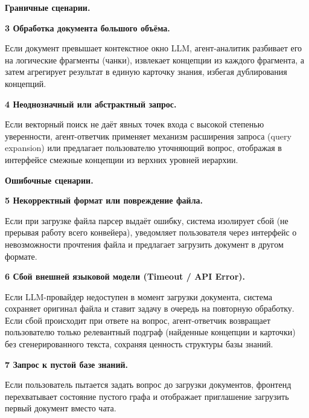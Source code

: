 \vspace{0.5em}
\textbf{Граничные сценарии.}

\vspace{0.5em}
\textbf{3 Обработка документа большого объёма.}

Если документ превышает контекстное окно LLM, агент-аналитик разбивает его на логические фрагменты (чанки), извлекает концепции из каждого фрагмента, а затем агрегирует результат в единую карточку знания, избегая дублирования концепций.

\vspace{0.5em}
\textbf{4 Неоднозначный или абстрактный запрос.}

Если векторный поиск не даёт явных точек входа с высокой степенью уверенности, агент-ответчик применяет механизм расширения запроса (query expansion) или предлагает пользователю уточняющий вопрос, отображая в интерфейсе смежные концепции из верхних уровней иерархии.

\vspace{0.5em}
\textbf{Ошибочные сценарии.}

\vspace{0.5em}
\textbf{5 Некорректный формат или повреждение файла.}

Если при загрузке файла парсер выдаёт ошибку, система изолирует сбой (не прерывая работу всего конвейера), уведомляет пользователя через интерфейс о невозможности прочтения файла и предлагает загрузить документ в другом формате.

\vspace{0.5em}
\textbf{6 Сбой внешней языковой модели (Timeout / API Error).}

Если LLM-провайдер недоступен в момент загрузки документа, система сохраняет оригинал файла и ставит задачу в очередь на повторную обработку. Если сбой происходит при ответе на вопрос, агент-ответчик возвращает пользователю только релевантный подграф (найденные концепции и карточки) без сгенерированного текста, сохраняя ценность структуры базы знаний.

\vspace{0.5em}
\textbf{7 Запрос к пустой базе знаний.}

Если пользователь пытается задать вопрос до загрузки документов, фронтенд перехватывает состояние пустого графа и отображает приглашение загрузить первый документ вместо чата.


